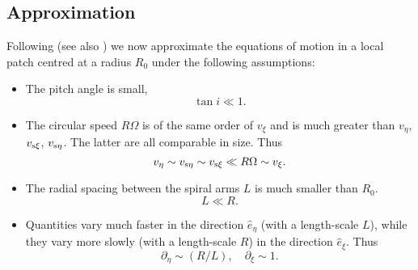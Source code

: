 \documentclass[useAMS,usenatbib]{mn2e}
\def\pa{\partial}
\begin{document}
\subsection{Approximation}

Following \cite{Roberts1969} (see also \citealt{Balbus1988}) we now approximate the equations of motion in a local patch centred at a radius $R_0$ under the following assumptions:
\begin{itemize}
\item The pitch angle is small,
\begin{equation} \tan i \ll 1. \end{equation}
\item The circular speed $R \Omega$ is of the same order of $v_\xi$ and is much greater than $v_\eta$, $v_{{\rm s}\xi}$, $v_{{\rm s}\eta}$. The latter are all comparable in size. Thus
\begin{equation} v_\eta \sim v_{{\rm s}\eta} \sim v_{{\rm s}\xi} \ll R \Omega \sim v_\xi. \end{equation}
\item The radial spacing between the spiral arms $L$ is much smaller than $R_0$.
\begin{equation} L \ll R. \end{equation} 
\item Quantities vary much faster in the direction $\hat{e}_\eta$ (with a length-scale $L$), while they vary more slowly (with a length-scale $R$) in the direction $\hat{e}_\xi$. Thus
\begin{equation} \pa_\eta \sim (R/L), \quad \pa_\xi \sim 1. \end{equation} 
\end{itemize}
\end{document}
